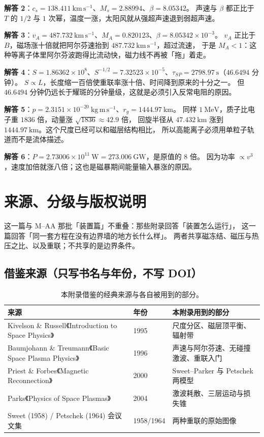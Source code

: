 \textbf{解答 2}：$c_s=138.411\ \mathrm{km\,s^{-1}}$、$M_s=2.88994$、$\beta=8.05342$。
声速与 $\beta$ 都正比于 $T$ 的 $1/2$ 与 $1$ 次幂，温度一涨，太阳风就从强超声速退到弱超声速。

\textbf{解答 3}：$v_A=487.732\ \mathrm{km\,s^{-1}}$、$M_A=0.820123$、$\beta=8.05342\times10^{-3}$。
$v_A$ 正比于 $B$，磁场涨十倍就把阿尔芬速抬到 $487.732\ \mathrm{km\,s^{-1}}$，超过流速，
于是 $M_A<1$：这种等离子体里阿尔芬波跑得比流动快，磁力线不再被「拖」着走。

\textbf{解答 4}：$S=1.86362\times10^{8}$、$S^{-1/2}=7.32523\times10^{-5}$、$\tau_{SP}=2798.97\ \mathrm{s}$（$46.6494$ 分钟）。
$S\propto L$，长度缩一百倍使重联率涨十倍、时间降到原来的十分之一。
但 $46.6494$ 分钟仍远长于耀斑的分钟量级，这就是必须引入反常电阻的原因。

\textbf{解答 5}：$p=2.3151\times10^{-20}\ \mathrm{kg\,m\,s^{-1}}$、$r_g=1444.97\ \mathrm{km}$。
同样 $1\ \mathrm{MeV}$，质子比电子重 $1836$ 倍，动量涨 $\sqrt{1836}\approx42.9$ 倍，
回旋半径从 $47.432\ \mathrm{km}$ 涨到 $1444.97\ \mathrm{km}$。这个尺度已经可以和磁层结构相比，
所以高能离子必须用单粒子轨道而不是流体描述。

\textbf{解答 6}：$P=2.73006\times10^{11}\ \mathrm{W}=273.006\ \mathrm{GW}$，是原值的 $8$ 倍。
因为功率 $\propto v^3$，速度加倍就涨八倍；这也是磁暴期间能量输入暴涨的原因。

\section{来源、分级与版权说明}
\label{sec:app-ab-source}

\begingroup\small
这一篇与 M--AA 那批「装置篇」不重叠：那些附录回答「装置怎么运行」，
这一篇回答「同一套方程在没有边界墙的地方长什么样」。
两者共享磁冻结、磁压与热压之比、以及重联；不共享的是边界条件。

\subsection*{借鉴来源（只写书名与年份，不写 DOI）}

\begin{table}[htbp]
\centering
\small
\caption{本附录借鉴的经典来源与各自被用到的部分。}
\label{tab:app-ab-source}
\begin{tabular}{p{4.4cm}p{1.8cm}p{6.6cm}}
\toprule
来源 & 年份 & 本附录用到的部分 \\
\midrule
Kivelson \& Russell《Introduction to Space Physics》 & 1995 & 尺度分区、磁层顶平衡、辐射带 \\
Baumjohann \& Treumann《Basic Space Plasma Physics》 & 1996 & 声速与阿尔芬速、无碰撞激波、重联入门 \\
Priest \& Forbes《Magnetic Reconnection》 & 2000 & Sweet--Parker 与 Petschek 两模型 \\
Parks《Physics of Space Plasmas》 & 2004 & 激波耗散、三层运动与损失锥 \\
Sweet (1958) / Petschek (1964) 会议文集 & 1958/1964 & 两种重联的原始图像 \\
\bottomrule
\end{tabular}

\end{table}

